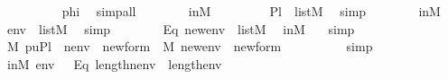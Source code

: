 \begin{isabellebody}
\ \ \ \ \ \ \ \ \isamarkupfalse%
\ phi\ \isamarkupfalse%
\ simp{\isacharunderscore}{\kern0pt}all\isanewline
\ \ \ \ \ \ \isamarkupfalse%
\ in{\isacharunderscore}{\kern0pt}M{\isacharprime}{\kern0pt}\ \isanewline
\ \ \ \ \ \ \isamarkupfalse%
\ {\isachardoublequoteopen}{\isacharquery}{\kern0pt}Pl{}\ {\isasymin}\ list{\isacharparenleft}{\kern0pt}M{\isacharparenright}{\kern0pt}{\isachardoublequoteclose}\ \isamarkupfalse%
\ simp\isanewline
\ \ \ \ \ \ \isamarkupfalse%
\ in{\isacharunderscore}{\kern0pt}M{\isacharprime}{\kern0pt}\ \isamarkupfalse%
\ {\isachardoublequoteopen}{\isacharquery}{\kern0pt}env\ {\isasymin}\ list{\isacharparenleft}{\kern0pt}M{\isacharparenright}{\kern0pt}{\isachardoublequoteclose}\ \isamarkupfalse%
\ simp\isanewline
\ \ \ \ \ \ \isamarkupfalse%
\ Eq{}{\isacharprime}{\kern0pt}{\isacharcolon}{\kern0pt}\ {\isachardoublequoteopen}{\isacharquery}{\kern0pt}new{\isacharunderscore}{\kern0pt}env\ {\isasymin}\ list{\isacharparenleft}{\kern0pt}M{\isacharparenright}{\kern0pt}{\isachardoublequoteclose}\ \isamarkupfalse%
\ in{\isacharunderscore}{\kern0pt}M{\isacharprime}{\kern0pt}\ \ \isamarkupfalse%
\ simp\ \isanewline
\ \ \ \ \ \ \isamarkupfalse%
\ \isanewline
\ \ \ \ \ \ \isamarkupfalse%
\ {\isachardoublequoteopen}{\isacharparenleft}{\kern0pt}M{\isacharcomma}{\kern0pt}\ {\isacharbrackleft}{\kern0pt}{\isasymtheta}{\isacharcomma}{\kern0pt}p{\isacharcomma}{\kern0pt}u{\isacharbrackright}{\kern0pt}{\isacharat}{\kern0pt}{\isacharquery}{\kern0pt}Pl{}{\isacharat}{\kern0pt}{\isacharbrackleft}{\kern0pt}{\isasympi}{\isacharbrackright}{\kern0pt}\ {\isacharat}{\kern0pt}\ nenv\ {\isasymTurnstile}\ {\isacharquery}{\kern0pt}new{\isacharunderscore}{\kern0pt}form{\isacharparenright}{\kern0pt}\ {\isasymlongleftrightarrow}\ {\isacharparenleft}{\kern0pt}M{\isacharcomma}{\kern0pt}\ {\isacharquery}{\kern0pt}new{\isacharunderscore}{\kern0pt}env\ {\isasymTurnstile}\ {\isacharquery}{\kern0pt}new{\isacharunderscore}{\kern0pt}form{\isacharparenright}{\kern0pt}{\isachardoublequoteclose}\isanewline
\ \ \ \ \ \ \ \ \isamarkupfalse%
\ simp\isanewline
\ \ \ \ \ \ \isamarkupfalse%
\ in{\isacharunderscore}{\kern0pt}M{\isacharprime}{\kern0pt}\ {\isacartoucheopen}env\ {\isasymin}\ {\isacharunderscore}{\kern0pt}{\isacartoucheclose}\ Eq{}{\isacharprime}{\kern0pt}\ {\isacartoucheopen}length{\isacharparenleft}{\kern0pt}nenv{\isacharparenright}{\kern0pt}\ {\isacharequal}{\kern0pt}\ length{\isacharparenleft}{\kern0pt}env{\isacharparenright}{\kern0pt}{\isacartoucheclose}\ \isanewline

\end{isabellebody}
